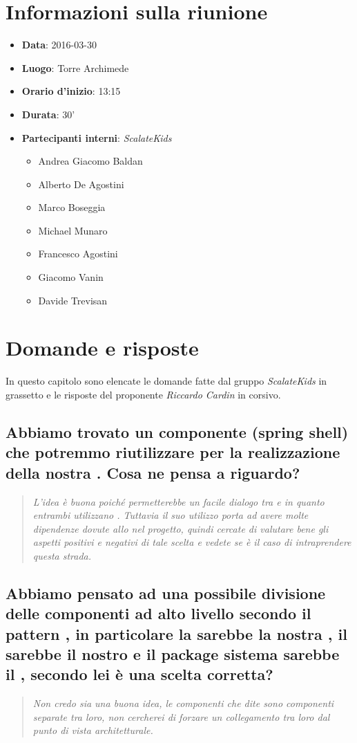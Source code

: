 \documentclass{scalatekids-article}
\begin{document}
\section{Informazioni sulla riunione}
\begin{itemize}
\item \textbf{Data}: 2016-03-30
\item \textbf{Luogo}: Torre Archimede
\item \textbf{Orario d'inizio}: 13:15
\item \textbf{Durata}: 30'
\item \textbf{Partecipanti interni}: \textit{ScalateKids}
  \begin{itemize}
  \item Andrea Giacomo Baldan 
  \item Alberto De Agostini
  \item Marco Boseggia
  \item Michael Munaro
  \item Francesco Agostini
  \item Giacomo Vanin
  \item Davide Trevisan
  \end{itemize}
\end{itemize}

\section{Domande e risposte}
In questo capitolo sono elencate le domande fatte dal gruppo \textit{ScalateKids} in grassetto e le risposte del proponente \textit{Riccardo Cardin} in corsivo.

\subsection{Abbiamo trovato un componente (spring shell) che potremmo riutilizzare per la realizzazione della nostra . Cosa ne pensa a riguardo?}
\begin{quote}
  \textit{L'idea è buona poiché permetterebbe un facile dialogo tra  e  in quanto entrambi utilizzano . Tuttavia il suo utilizzo porta ad avere molte dipendenze dovute allo  nel progetto, quindi cercate di valutare bene gli aspetti positivi e negativi di tale scelta e vedete se è il caso di intraprendere questa strada.}
\end{quote}
\subsection{Abbiamo pensato ad una possibile divisione delle componenti ad alto livello secondo il pattern , in particolare la  sarebbe la nostra , il  sarebbe il nostro  e il package sistema sarebbe il , secondo lei è una scelta corretta?\\}
\begin{quote}
  \textit{Non credo sia una buona idea, le componenti che dite sono componenti separate tra loro, non cercherei di forzare un collegamento tra loro dal punto di vista architetturale.}
\end{quote}
\end{document}
